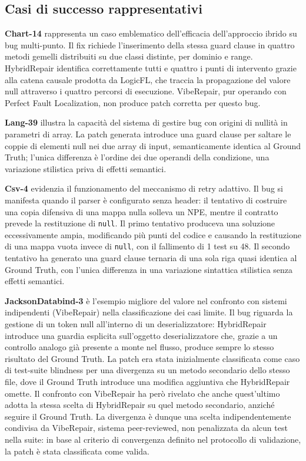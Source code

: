 \subsection{Casi di successo rappresentativi}

\textbf{Chart-14} rappresenta un caso emblematico dell'efficacia dell'approccio ibrido
su bug multi-punto. Il fix richiede l'inserimento della stessa guard clause in quattro
metodi gemelli distribuiti su due classi distinte, per dominio e range.
HybridRepair identifica correttamente tutti e quattro i punti di intervento grazie
alla catena causale prodotta da LogicFL, che traccia la propagazione del valore null
attraverso i quattro percorsi di esecuzione. VibeRepair, pur operando con Perfect
Fault Localization, non produce patch corretta per questo bug.

\textbf{Lang-39} illustra la capacità del sistema di gestire bug con origini di nullità
in parametri di array. La patch generata introduce una guard clause per saltare le
coppie di elementi null nei due array di input, semanticamente identica al Ground
Truth; l'unica differenza è l'ordine dei due operandi della condizione, una variazione
stilistica priva di effetti semantici.

\textbf{Csv-4} evidenzia il funzionamento del meccanismo di retry adattivo.
Il bug si manifesta quando il parser è configurato senza header: il tentativo di costruire
una copia difensiva di una mappa nulla solleva un NPE, mentre il contratto prevede la
restituzione di \texttt{null}.
Il primo tentativo produceva una soluzione eccessivamente ampia, modificando più punti del
codice e causando la restituzione di una mappa vuota invece di \texttt{null}, con il
fallimento di 1 test su 48. Il secondo tentativo ha generato una guard clause ternaria
di una sola riga quasi identica al Ground Truth, con l'unica differenza in una variazione
sintattica stilistica senza effetti semantici.

\textbf{JacksonDatabind-3} è l'esempio migliore del valore nel confronto con sistemi indipendenti (VibeRepair)
nella classificazione dei casi limite. Il bug riguarda la gestione di un token null
all'interno di un deserializzatore: HybridRepair introduce una guardia esplicita
sull'oggetto deserializzatore che, grazie a un controllo analogo già presente a monte
nel flusso, produce sempre lo stesso risultato del Ground Truth.
La patch era stata inizialmente classificata come caso di test-suite blindness per
una divergenza su un metodo secondario dello stesso file, dove il Ground Truth
introduce una modifica aggiuntiva che HybridRepair omette. Il confronto con
VibeRepair ha però rivelato che anche quest'ultimo adotta la stessa scelta di
HybridRepair su quel metodo secondario, anziché seguire il Ground Truth. La
divergenza è dunque una scelta indipendentemente condivisa da VibeRepair, sistema peer-reviewed,
non penalizzata da alcun test nella suite: in base al criterio di convergenza definito
nel protocollo di validazione, la patch è stata classificata come valida.

